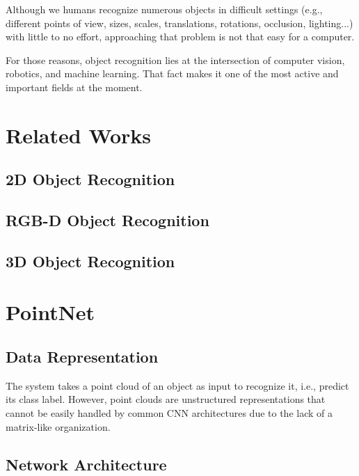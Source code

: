 Although we humans recognize numerous objects in difficult settings (e.g., different points of view, sizes, scales, translations, rotations, occlusion, lighting...) with little to no effort, approaching that problem is not that easy for a computer.

For those reasons, object recognition lies at the intersection of computer vision, robotics, and machine learning. That fact makes it one of the most active and important fields at the moment. 

\section{Related Works}
\label{cha:objrecog:sec:relatedworks}

\subsection{2D Object Recognition}
\label{cha:objrecog:sec:relatedworks:subsec:2d}

\subsection{RGB-D Object Recognition}
\label{cha:objrecog:sec:relatedworks:subsec:rgbd}

\subsection{3D Object Recognition}
\label{cha:objrecog:sec:relatedworks:subsec:3d}

\section{PointNet}
\label{cha:objrecog:sec:pointnet}

\subsection{Data Representation}
\label{cha:objrecog:sec:pointnet:subsec:data}

The system takes a point cloud of an object as input to recognize it, i.e., predict its class label. However, point clouds are unstructured representations that cannot be easily handled by common \ac{CNN} architectures due to the lack of a matrix-like organization.

\subsection{Network Architecture}
\label{cha:objrecog:sec:pointnet:subsec:network}

